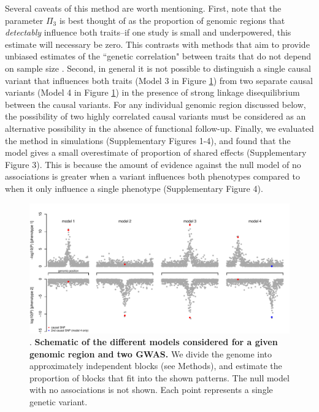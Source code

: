 \documentclass[11pt,titlepage]{article}
\begin{document}
Several caveats of this method are worth mentioning. 
First, note that the parameter $\Pi_3$ is best thought of as the proportion of genomic regions that \emph{detectably} influence both traits--if one study is small and underpowered, this estimate will necessary be zero. 
This contrasts with methods that aim to provide unbiased estimates of the ``genetic correlation" between traits that do not depend on sample size \citep{bulik2015atlas, Yang:2011aa, Loh:2015aa}.
Second, in general it is not possible to distinguish a single causal variant that influences both traits (Model 3 in Figure \ref{f_schematic}) from two separate causal variants (Model 4 in Figure \ref{f_schematic}) in the presence of strong linkage disequilibrium between the causal variants. 
For any individual genomic region discussed below, the possibility of two highly correlated causal variants must be considered as an alternative possibility in the absence of functional follow-up. 
Finally, we evaluated the method in simulations (Supplementary Figures 1-4), and found that the model gives a small overestimate of proportion of shared effects (Supplementary Figure 3). 
This is because the amount of evidence against the null model of no associations is greater when a variant influences both phenotypes compared to when it only influence a single phenotype (Supplementary Figure 4). 

\begin{figure}
\begin{center}
\includegraphics[scale = 0.7]{figs/schematic.pdf}
\caption{. \textbf{Schematic of the different models considered for a given genomic region and two GWAS.} We divide the genome into approximately independent blocks (see Methods), and estimate the proportion of blocks that fit into the shown patterns. The null model with no associations is not shown. Each point represents a single genetic variant.}\label{f_schematic}
\end{center}
\end{figure}
\end{document}
